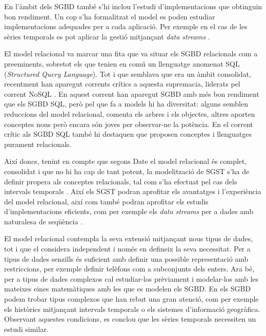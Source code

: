 En l'àmbit dels SGBD també s'hi inclou l'estudi d'implementacions que
obtinguin bon rendiment. Un cop s'ha formalitzat el model es poden
estudiar implementacions adequades per a cada aplicació. Per exemple
en el cas de les sèries temporals es pot aplicar la gestió mitjançant
\emph{data streams} \parencite{babcock02}.


El model relacional va marcar una fita que va situar els SGBD
relacionals com a preeminents, sobretot els que tenien en comú un
llenguatge anomenat SQL (\emph{Structured Query Language}). Tot i que
semblava que era un àmbit consolidat, recentment han aparegut corrents
crítics a aquesta supremacia, liderats pel corrent
NoSQL \parencite{edlich:nosql,stonebraker10}.  En aquest corrent han
aparegut SGBD amb més bon rendiment que els SGBD SQL, però pel que fa
a models hi ha diversitat: alguns semblen reduccions del model
relacional, \textcite[cap.~14,27]{date06} comenta els arbres i els
objectes, altres aporten conceptes nous però encara són joves per
observar-ne la potència. En el corrent crític als SGBD SQL també hi
destaquen \textcite{date:thethirdmanifesto} que proposen conceptes i
llenguatges purament relacionals.




Així doncs, tenint en compte que segons Date el model relacional és
complet, consolidat i que no hi ha cap de tant potent, la modelització
de SGST s'ha de definir propera als conceptes relacionals, tal com
s'ha efectuat pel cas dels intervals
temporals \parencite{date02:_tempor_data_relat_model}. Així els SGST
podran aprofitar els avantatges i l'experiència del model relacional,
així com també podran aprofitar els estudis d'implementacions
eficients, com per exemple els \emph{data streams} per a dades amb
naturalesa de seqüència \parencite{bai05}.

El model relacional contempla la seva extensió mitjançant nous tipus
de dades, tot i que el considera independent i només en defineix la
seva necessitat. Per a tipus de dades senzills és suficient amb
definir una possible representació amb restriccions, per exemple
definir telèfons com a subconjunts dels enters. Ara bé, per a tipus de
dades complexos cal estudiar-los prèviament i modelar-los amb les
mateixes eines matemàtiques amb les que es modelen els SGBD.  En els
SGBD podem trobar tipus complexos que han rebut una gran atenció, com
per exemple els històrics mitjançant intervals temporals o els
sistemes d'informació geogràfica. Observant aquestes condicions, es
conclou que les sèries temporals necessiten un estudi similar.











